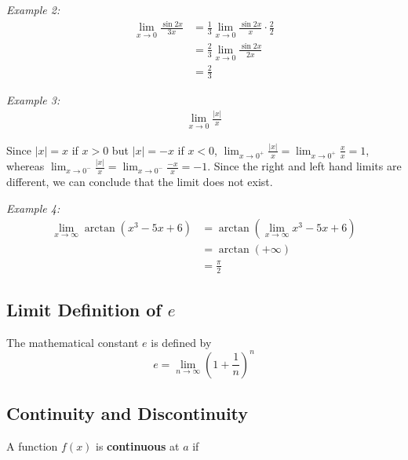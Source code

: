 \documentclass{article}
\begin{document}
            \pagebreak
            \noindent \color{blue} \textit{Example 2:} \color{black} \\

            \begin{align*}
                \lim_{x\to0}\frac{\sin{2x}}{3x} &= \frac{1}{3}\lim_{x\to0}\frac{\sin{2x}}{x}\cdot\frac{2}{2} \\
                &= \frac{2}{3}\lim_{x\to0}\frac{\sin{2x}}{2x} \\
                &=\frac{2}{3}
            \end{align*}

            \noindent \color{blue} \textit{Example 3:} \color{black} \\

            \begin{align*}
                \lim_{x\to0}\frac{|x|}{x}
            \end{align*}

            \noindent Since $|x|=x$ if $x>0$ but $|x|=-x$ if $x<0$, $\lim_{x\to 0^+}\frac{|x|}{x}
            =\lim_{x\to0^+}\frac{x}{x}=1$, whereas
            $\lim_{x\to0^-}\frac{|x|}{x}=\lim_{x\to0^-}\frac{-x}{x}=-1$.
            Since the right and left hand limits are different, we can conclude that the
            limit does not exist.

            \noindent \color{blue} \textit{Example 4:} \color{black} \\
            \begin{align*}
                \lim_{x\to\infty}\arctan{(x^3-5x+6)} &= \arctan{(\lim_{x\to\infty}x^3-5x+6)} \\
                &= \arctan{(+\infty)} \\
                &= \frac{\pi}{2}
            \end{align*}

        \subsection{Limit Definition of $e$}
            The mathematical constant $e$ is defined by \\
            \begin{equation*}
                e=\lim_{n\to\infty}\left(1+\frac{1}{n}\right)^n
            \end{equation*}


        \subsection{Continuity and Discontinuity}
            A function $f(x)$ is \textbf{continuous} at $a$ if \\
\end{document}
